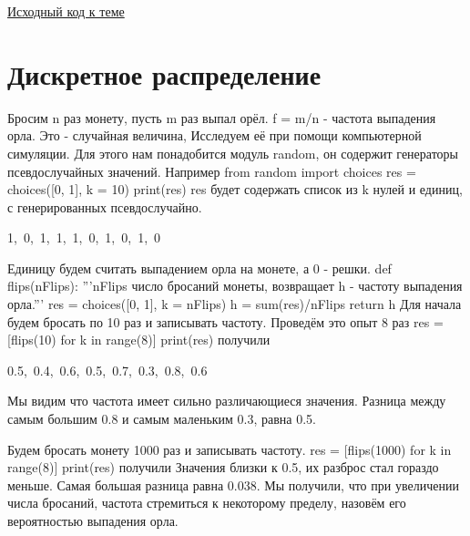 \href{prob.zip}{Исходный код к теме}%
\section{Дискретное распределение}
Бросим n раз монету, пусть m раз выпал орёл.
f = m/n -  частота выпадения орла.
Это - случайная величина, 
Исследуем её при помощи компьютерной симуляции. 
Для этого нам понадобится модуль random, он содержит 
генераторы псевдослучайных значений.
Например
\nwenddocs{}\endmoddef\nwstartdeflinemarkup\nwenddeflinemarkup
from random import choices
res = choices([0, 1], k = 10)
print(res)
\nwendcode{}\nwdocspar
res будет содержать список из k нулей и единиц,
с генерированных псевдослучайно.

{\Tt{}1,\ 0,\ 1,\ 1,\ 1,\ 0,\ 1,\ 0,\ 1,\ 0\nwendquote}

Единицу будем считать выпадением орла на монете,
а 0 - решки.
\nwenddocs{}\plusendmoddef\nwstartdeflinemarkup\nwenddeflinemarkup
def flips(nFlips):
        '''nFlips число бросаний монеты,
        возвращает h - частоту выпадения орла.'''
        res = choices([0, 1], k = nFlips)
        h = sum(res)/nFlips 
        return  h
\nwendcode{}\nwdocspar
Для начала будем бросать по 10 раз и записывать частоту.
Проведём это опыт 8 раз
\nwenddocs{}\plusendmoddef\nwstartdeflinemarkup\nwenddeflinemarkup
res = [flips(10) for k in range(8)]
print(res)
\nwendcode{}\nwdocspar
получили

{\Tt{}0.5,\ 0.4,\ 0.6,\ 0.5,\ 0.7,\ 0.3,\ 0.8,\ 0.6\nwendquote}

Мы видим что частота имеет сильно различающиеся значения.
Разница между самым большим 0.8 и самым маленьким 0.3, 
равна 0.5. 

Будем бросать монету 1000 раз и записывать частоту.
\nwenddocs{}\plusendmoddef\nwstartdeflinemarkup\nwenddeflinemarkup
res = [flips(1000) for k in range(8)]
print(res)
\nwendcode{}\nwdocspar
получили
\nwenddocs{}\moddef{}\endmoddef\nwstartdeflinemarkup\nwenddeflinemarkup
[0.515, 0.484, 0.522, 0.498, 0.498, 0.513, 0.511, 0.486]
\nwendcode{}\nwdocspar
Значения близки к 0.5, их разброс стал гораздо меньше.
Самая большая разница равна 0.038.
Мы получили, что при увеличении числа бросаний,
частота стремиться к некоторому пределу, 
назовём его  вероятностью выпадения орла.



